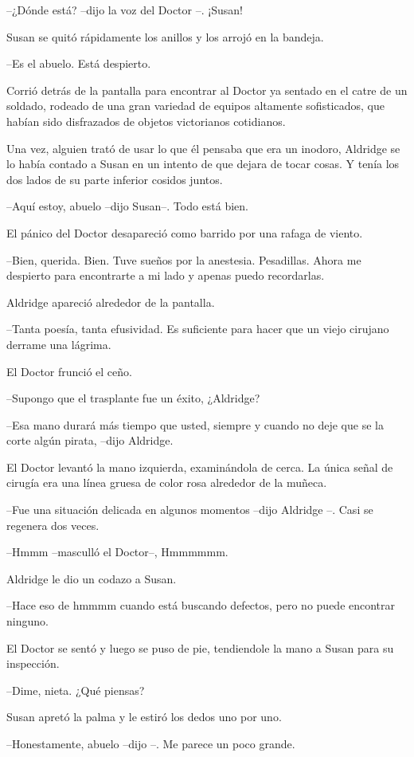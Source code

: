 --¿Dónde está? --dijo la voz del Doctor --. ¡Susan!

Susan se quitó rápidamente los anillos y los arrojó en la bandeja.

--Es el abuelo. Está despierto.

Corrió detrás de la pantalla para encontrar al Doctor ya sentado en el catre de un soldado, rodeado de una gran variedad de equipos altamente sofisticados, que habían sido disfrazados de objetos victorianos cotidianos.

Una vez, alguien trató de usar lo que él pensaba que era un inodoro, Aldridge se lo había contado a Susan en un intento de que dejara de tocar cosas. Y tenía los dos lados de su parte inferior cosidos juntos.

--Aquí estoy, abuelo --dijo Susan--. Todo está bien.

El pánico del Doctor desapareció como barrido por una rafaga de viento.

--Bien, querida. Bien. Tuve sueños por la anestesia. Pesadillas. Ahora me despierto para encontrarte a mi lado y apenas puedo recordarlas.

Aldridge apareció alrededor de la pantalla. 

--Tanta poesía, tanta efusividad. Es suficiente para hacer que un viejo cirujano derrame una lágrima.

El Doctor frunció el ceño. 

--Supongo que el trasplante fue un éxito, ¿Aldridge?

--Esa mano durará más tiempo que usted, siempre y cuando no deje que se la corte algún pirata, --dijo Aldridge.

El Doctor levantó la mano izquierda, examinándola de cerca. La única señal de cirugía era una línea gruesa de color rosa alrededor de la muñeca.

--Fue una situación delicada en algunos momentos --dijo Aldridge --. Casi se regenera dos veces.

--Hmmm --masculló el Doctor--, Hmmmmmm.

Aldridge le dio un codazo a Susan. 

--Hace eso de hmmmm cuando está buscando defectos, pero no puede encontrar ninguno.

El Doctor se sentó y luego se puso de pie, tendiendole la mano a Susan para su inspección.

--Dime, nieta. ¿Qué piensas?

Susan apretó la palma y le estiró los dedos uno por uno.

--Honestamente, abuelo --dijo --. Me parece un poco grande.